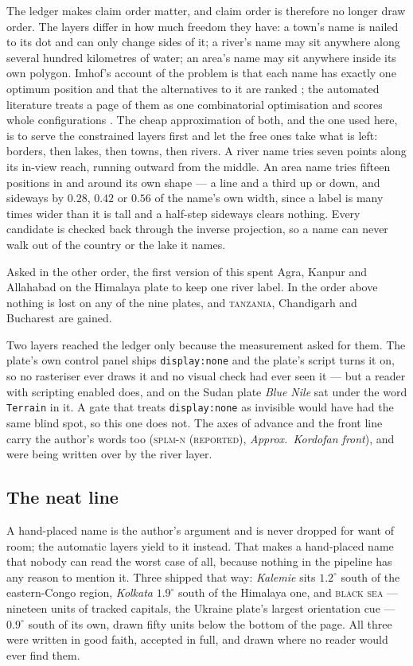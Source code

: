 \documentclass[11pt]{article}
\begin{document}
The ledger makes claim order matter, and claim order is therefore no
longer draw order. The layers differ in how much freedom they have: a
town's name is nailed to its dot and can only change sides of it; a
river's name may sit anywhere along several hundred kilometres of water;
an area's name may sit anywhere inside its own polygon. Imhof's account
of the problem is that each name has exactly one optimum position and
that the alternatives to it are ranked \parencite{imhof-names}; the
automated literature treats a page of them as one combinatorial
optimisation and scores whole configurations
\parencite{christensen-label-placement}. The cheap
approximation of both, and the one used here, is to serve the constrained
layers first and let the free ones take what is left: borders, then
lakes, then towns, then rivers. A river name tries seven points along its
in-view reach, running outward from the middle. An area name tries
fifteen positions in and around its own shape --- a line and a third up
or down, and sideways by $0.28$, $0.42$ or $0.56$ of the name's own
width, since a label is many times wider than it is tall and a half-step
sideways clears nothing. Every candidate is checked back through the
inverse projection, so a name can never walk out of the country or the
lake it names.

Asked in the other order, the first version of this spent Agra, Kanpur
and Allahabad on the Himalaya plate to keep one river label. In the order
above nothing is lost on any of the nine plates, and \textsc{tanzania},
Chandigarh and Bucharest are gained.

Two layers reached the ledger only because the measurement asked for
them. The plate's own control panel ships \texttt{display:none} and the
plate's script turns it on, so no rasteriser ever draws it and no visual
check had ever seen it --- but a reader with scripting enabled does, and
on the Sudan plate \emph{Blue Nile} sat under the word \texttt{Terrain}
in it. A gate that treats \texttt{display:none} as invisible would have
had the same blind spot, so this one does not. The axes of advance and
the front line carry the author's words too
(\textsc{splm-n (reported)}, \emph{Approx.\ Kordofan front}), and were
being written over by the river layer.

\subsection{The neat line}
\label{sec:neat-line}

A hand-placed name is the author's argument and is never dropped for want
of room; the automatic layers yield to it instead. That makes a
hand-placed name that nobody can read the worst case of all, because
nothing in the pipeline has any reason to mention it. Three shipped that
way: \emph{Kalemie} sits $1.2^\circ$ south of the eastern-Congo region,
\emph{Kolkata} $1.9^\circ$ south of the Himalaya one, and
\textsc{black sea} --- nineteen units of tracked capitals, the Ukraine
plate's largest orientation cue --- $0.9^\circ$ south of its own, drawn
fifty units below the bottom of the page. All three were written in good
faith, accepted in full, and drawn where no reader would ever find them.
\end{document}
